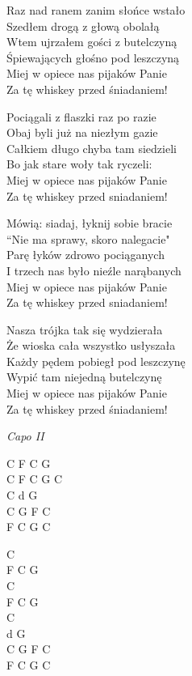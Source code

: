 \begin{text}


Raz nad ranem zanim słońce wstało\\
Szedłem drogą z głową obolałą\\
Wtem ujrzałem gości z butelczyną\\
Śpiewających głośno pod leszczyną\\
\vin Miej w opiece nas pijaków Panie\\
\vin Za tę whiskey przed śniadaniem!
    \hfill\break
    \hfill\break

Pociągali z flaszki raz po razie\\
Obaj byli już na niezłym gazie\\
Całkiem długo chyba tam siedzieli\\
Bo jak stare woły tak ryczeli:\\
\vin Miej w opiece nas pijaków Panie\\
\vin Za tę whiskey przed sniadaniem!

Mówią: siadaj, łyknij sobie bracie\\
“Nie ma sprawy, skoro nalegacie"\\
Parę łyków zdrowo pociąganych\\
I trzech nas było nieźle narąbanych\\
\vin Miej w opiece nas pijaków Panie\\
\vin Za tę whiskey przed sniadaniem!

Nasza trójka tak się wydzierała\\
Że wioska cała wszystko usłyszała\\
Każdy pędem pobiegł pod leszczynę\\
Wypić tam niejedną butelczynę\\
\vin Miej w opiece nas pijaków Panie\\
\vin Za tę whiskey przed śniadaniem!

\end{text}
\begin{chord}
\textit{Capo II}

C F C G\\
C F C G C\\
C d G\\
C G F C\\
F C G C

C\\
F C G\\
C\\
F C G\\
C\\
d G\\
C G F C\\
F C G C\\

\end{chord}